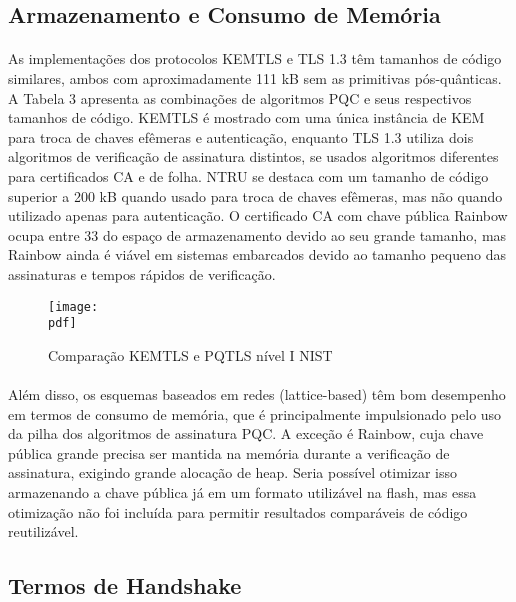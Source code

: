 \documentclass[letterpaper,11pt,leqno]{article}
\newcommand{\pdf}{figures/figures}
\begin{document}
\subsection{Armazenamento e Consumo de Memória}

\paragraph{}
As implementações dos protocolos KEMTLS e TLS 1.3 têm tamanhos de código
similares, ambos com aproximadamente 111 kB sem as primitivas pós-quânticas. A
Tabela 3 apresenta as combinações de algoritmos PQC e seus respectivos tamanhos
de código. KEMTLS é mostrado com uma única instância de KEM para troca de chaves
efêmeras e autenticação, enquanto TLS 1.3 utiliza dois algoritmos de verificação
de assinatura distintos, se usados algoritmos diferentes para certificados CA e
de folha. NTRU se destaca com um tamanho de código superior a 200 kB quando
usado para troca de chaves efêmeras, mas não quando utilizado apenas para
autenticação. O certificado CA com chave pública Rainbow ocupa entre 33%
do espaço de armazenamento devido ao seu grande tamanho, mas Rainbow ainda é
viável em sistemas embarcados devido ao tamanho pequeno das assinaturas e tempos
rápidos de verificação.

\begin{figure}[H]
	{\texttt{[image: \\pdf]}}
	\caption{Comparação KEMTLS e PQTLS nível I NIST}
	\label{f:table3}\end{figure}

\paragraph{}
Além disso, os esquemas baseados em redes (lattice-based) têm bom desempenho em
termos de consumo de memória, que é principalmente impulsionado pelo uso da
pilha dos algoritmos de assinatura PQC. A exceção é Rainbow, cuja chave pública
grande precisa ser mantida na memória durante a verificação de assinatura,
exigindo grande alocação de heap. Seria possível otimizar isso armazenando a
chave pública já em um formato utilizável na flash, mas essa otimização não foi
incluída para permitir resultados comparáveis de código reutilizável.

\subsection{Termos de Handshake}
\end{document}
